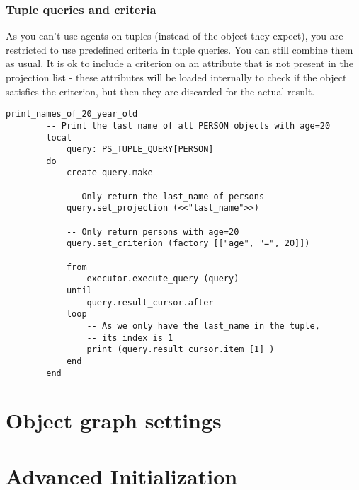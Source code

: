 \subsubsection{Tuple queries and criteria}
As you can't use agents on tuples (instead of the object they expect), you are restricted to use predefined criteria in tuple queries. You can still combine them as usual.
It is ok to include a criterion on an attribute that is not present in the projection list - these attributes will be loaded internally to check if the object satisfies the criterion, but then they are discarded for the actual result.

\begin{lstlisting}[language=OOSC2Eiffel, captionpos=b, caption={}, label={lst:tuple_projection_selection}]
	print_names_of_20_year_old
		-- Print the last name of all PERSON objects with age=20
		local
			query: PS_TUPLE_QUERY[PERSON]
		do
			create query.make

			-- Only return the last_name of persons
			query.set_projection (<<"last_name">>)

			-- Only return persons with age=20
			query.set_criterion (factory [["age", "=", 20]])

			from
				executor.execute_query (query)
			until
				query.result_cursor.after
			loop
				-- As we only have the last_name in the tuple,
				-- its index is 1
				print (query.result_cursor.item [1] )
			end			
		end
\end{lstlisting}


\section{Object graph settings}

\section{Advanced Initialization}





